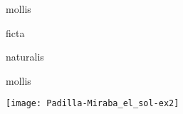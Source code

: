 \documentclass{article}
\newlength{\minim}
\begin{document}
\hspace{2\minim}
\begin{hexachord}{mollis}
\end{hexachord}
\mutate
\begin{levelup}{1}
    \begin{hexachord}{ficta}
    \end{hexachord}
\end{levelup}
\mutate
\begin{levelup}{2}
    \begin{hexachord}{naturalis}
    \end{hexachord}
\end{levelup}
\mutate
\begin{hexachord}{mollis}
\end{hexachord}

\texttt{[image: Padilla-Miraba\_el\_sol-ex2]}
\end{document}
